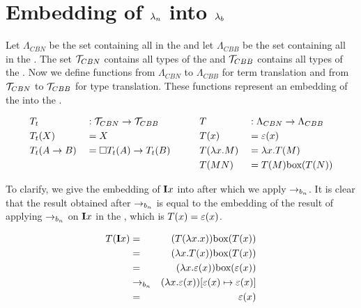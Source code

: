 \section{\texorpdfstring{Embedding of \boldmath${\lambda_n}$ into \boldmath${\lambda_b}$}{Embedding of call-by-name lambda calculus into the call-by-box lambda calculus}}


Let $\Lambda_{CBN}$ be the set containing all \lterms in the \lan
and let $\Lambda_{CBB}$ be the set containing all \lterms in the \lab. 
The set $\mathcal{T}_{CBN}$ contains all types of the \lan and $\mathcal{T}_{CBB}$ contains all types of the \lab. 
Now we define functions from $\Lambda_{CBN}$ to $\Lambda_{CBB}$ for term translation and from $\mathcal{T}_{CBN}$ to $\mathcal{T}_{CBB}$ for type translation. 
These functions represent an embedding of the \lan into the \lab. 

\[
\begin{aligned}
  & T_t          & & : \mathcal{T}_{CBN} \to \mathcal{T}_{CBB}           & & \quad & & T              & &: \Lambda_{CBN} \to \Lambda_{CBB} \\
  & T_t(X)       & & = X                               & & \quad & & T(x)           & &= \varepsilon(x) \\
  & T_t(A \to B) & & = \square{T_t(A)} \to T_t(B)  & & \quad & & T(\lambda {x}.{M}) & &= \lambda {x}.{T(M)} \\
  &                 & &                                   & & \quad & & T(M N)         & &= T(M) \text{box}({T(N)})
\end{aligned}
\]

To clarify, we give the embedding of $\mathbf{I} x$ into \lab after which we apply $\to_{b_n}$. 
It is clear that the result obtained after $\to_{b_n}$ is equal to the embedding of the result of applying $\to_{b_n}$ on $\mathbf{I} x$ in the \lan, which is $T(x) = \varepsilon(x)$.  

\begin{eqnarray*}
  T(\mathbf{I} x) &=& (T(\lambda {x}.{x})) \text{box}({T(x)}) \\
  &=& (\lambda {x}.{T(x)}) \text{box}({T(x)}) \\
  &=& (\lambda {x}.{\varepsilon(x)}) \text{box}({\varepsilon(x)}) \\
  &\to_{b_n}& (\lambda {x}.{\varepsilon(x)}) [{\varepsilon(x)}\mapsto{\varepsilon(x)}] \\
  &=& \varepsilon(x)
\end{eqnarray*}


